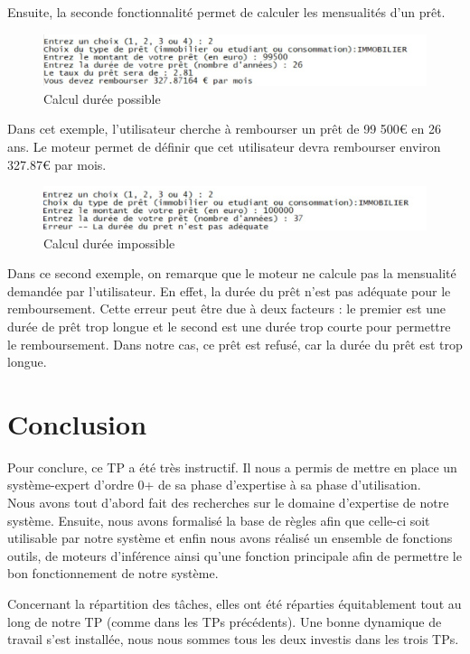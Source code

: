 \documentclass[
]{article}
\begin{document}
Ensuite, la seconde fonctionnalité permet de calculer les mensualités
d'un prêt. 

\begin{figure}[H]
  \centering
  \includegraphics{img/calcul_montant_possible.jpg}
  \caption{Calcul durée possible}
\end{figure}

Dans cet exemple, l'utilisateur cherche à rembourser un prêt de 99 500€
en 26 ans. Le moteur permet de définir que cet utilisateur devra
rembourser environ 327.87€ par mois.

\begin{figure}[H]
  \centering
  \includegraphics{img/calcul_montant_impossible.jpg}
  \caption{Calcul durée impossible}
\end{figure}


Dans ce second exemple, on remarque que le moteur ne calcule pas la mensualité demandée
par l'utilisateur. En effet, la durée du prêt n'est pas adéquate pour le
remboursement. Cette erreur peut être due à deux facteurs : le premier
est une durée de prêt trop longue et le second est une durée trop courte
pour permettre le remboursement. Dans notre cas, ce prêt est refusé, car
la durée du prêt est trop longue.

\pagebreak

\hypertarget{conclusion}{%
\section{Conclusion}\label{conclusion}}

Pour conclure, ce TP a été très instructif. Il nous a permis de mettre
en place un système-expert d'ordre 0+ de sa phase d'expertise à sa phase
d'utilisation.\\
Nous avons tout d'abord fait des recherches sur le domaine d'expertise
de notre système. Ensuite, nous avons formalisé la base de règles afin
que celle-ci soit utilisable par notre système et enfin nous avons
réalisé un ensemble de fonctions outils, de moteurs d'inférence ainsi
qu'une fonction principale afin de permettre le bon fonctionnement de
notre système.

Concernant la répartition des tâches, elles ont été réparties
équitablement tout au long de notre TP (comme dans les TPs précédents).
Une bonne dynamique de travail s'est installée, nous nous sommes tous les
deux investis dans les trois TPs.
\end{document}
